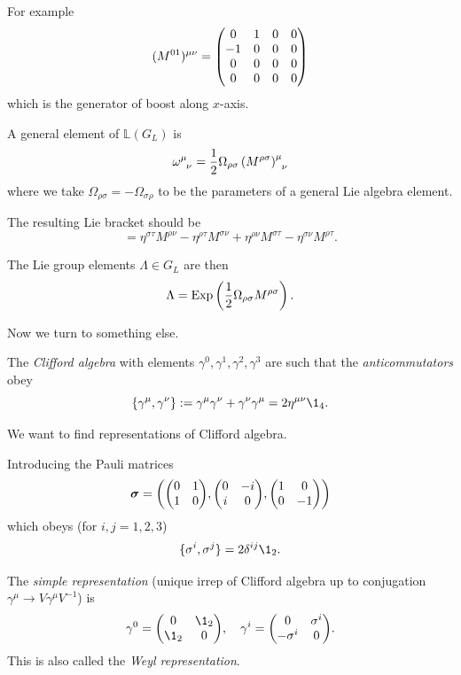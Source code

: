 \documentclass[a4paper,11pt]{article}
\begin{document}
	For example
	\[
		(M ^{01})^{\mu \nu} = \mqty(0 & 1 & 0 & 0\\ -1 & 0 & 0 & 0\\ 0 & 0 & 0 & 0\\ 0 & 0 & 0 & 0)
	\]
	which is the generator of boost along $x$-axis.

	A general element of $\mathbb{L}(G_L)$ is 
	\[
		\omega\indices{^\mu_\nu} = \frac{1}{2} \Omega _{\rho \sigma} \left( M ^{\rho \sigma} \right)\indices{^\mu_\nu}
	\]
	where we take $\Omega _{\rho \sigma} = - \Omega _{\sigma \rho}$ to be the parameters of a general Lie algebra element.

	The resulting Lie bracket should be 
	\begin{equation}
		[M ^{\rho \sigma}, M ^{\tau \nu}] = \eta ^{\sigma \tau} M ^{\rho \nu} - \eta ^{\rho \tau} M ^{\sigma \nu} + \eta ^{\rho \nu} M ^{\sigma \tau} - \eta ^{\sigma \nu} M ^{\rho \tau}.
		\label{eq:4.1.1}
	\end{equation}

	The Lie group elements $\Lambda \in G_L$ are then
	\[
		\Lambda = \operatorname{Exp}\left( \frac{1}{2} \Omega _{\rho \sigma} M ^{\rho \sigma} \right).
	\]
	
	Now we turn to something else.

	\begin{defi}
		The \emph{Clifford algebra} with elements $\gamma^0, \gamma^1, \gamma^2, \gamma^3$ are such that the \emph{anticommutators} obey 
	\begin{equation}
		\{\gamma^\mu, \gamma^\nu\} := \gamma^\mu \gamma^\nu + \gamma^\nu \gamma^\mu = 2 \eta ^{\mu \nu} \1_4.
		\label{eq:4.1.2}
	\end{equation}
	\end{defi}

	We want to find representations of Clifford algebra.

	Introducing the Pauli matrices
	\[
		\bm \sigma = \left( \mqty(\pmat{1}),\mqty(\pmat{2}),\mqty(\pmat{3}) \right)
	\]
	which obeys (for $i,j = 1,2,3$)
	\[
		\{\sigma^i , \sigma^j\} = 2 \delta ^{ij} \1_2.
	\]
	
	\begin{defi}
		The \emph{simple representation} (unique irrep of Clifford algebra up to conjugation $\gamma^\mu \to V \gamma^\mu V^{-1}$) is 
	\begin{equation}
		\gamma^0 = \mqty(0 & \1_2\\ \1_2 & 0), \quad \gamma^i = \mqty(0 & \sigma^i\\ -\sigma^i & 0).
		\label{eq:4.1.3}
	\end{equation}
	This is also called the \emph{Weyl representation}.
	\end{defi}
\end{document}
